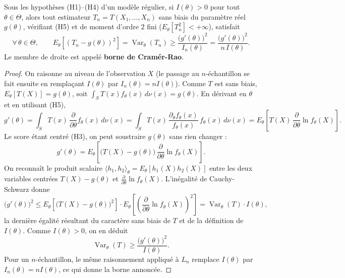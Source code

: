 \begin{mdframed}
\begin{proposition}
Sous les hypothèses (H1)--(H4) d'un modèle régulier, si $I(\theta) > 0$ pour tout
$\theta \in \Theta$, alors tout estimateur $T_n = T(X_1, \dots, X_n)$ sans biais du
paramètre réel $g(\theta)$, vérifiant (H5) et de moment d'ordre $2$ fini
($E_\theta[T_n^2] < +\infty$), satisfait
\[
  \forall\, \theta \in \Theta, \qquad
  E_\theta\!\left[ (T_n - g(\theta))^{2} \right]
  = \operatorname{Var}_\theta(T_n)
  \geq \frac{\bigl(g'(\theta)\bigr)^{2}}{I_n(\theta)}
  = \frac{\bigl(g'(\theta)\bigr)^{2}}{n\, I(\theta)}.
\]
Le membre de droite est appelé \textbf{borne de Cramér-Rao}.
\end{proposition}
\end{mdframed}

\begin{proof}
On raisonne au niveau de l'observation $X$ (le passage au $n$-échantillon se fait
ensuite en remplaçant $I(\theta)$ par $I_n(\theta) = n I(\theta)$). Comme $T$ est
sans biais, $E_\theta[T(X)] = g(\theta)$, soit
$\int_S T(x) f_\theta(x)\, d\nu(x) = g(\theta)$. En dérivant en $\theta$ et en
utilisant (H5),
\[
  g'(\theta)
  = \int_S T(x)\, \frac{\partial}{\partial\theta} f_\theta(x)\, d\nu(x)
  = \int_S T(x)\, \frac{\partial_\theta f_\theta(x)}{f_\theta(x)}\, f_\theta(x)\, d\nu(x)
  = E_\theta\!\left[ T(X)\, \frac{\partial}{\partial\theta} \ln f_\theta(X) \right].
\]
Le score étant centré (H3), on peut soustraire $g(\theta)$ sans rien changer :
\[
  g'(\theta)
  = E_\theta\!\left[ \bigl(T(X) - g(\theta)\bigr)\, \frac{\partial}{\partial\theta} \ln f_\theta(X) \right].
\]
On reconnaît le produit scalaire $\langle h_1, h_2 \rangle_\theta =
E_\theta[h_1(X) h_2(X)]$ entre les deux variables centrées $T(X) - g(\theta)$ et
$\frac{\partial}{\partial\theta} \ln f_\theta(X)$. L'inégalité de Cauchy-Schwarz
donne
\[
  \bigl(g'(\theta)\bigr)^{2}
  \leq E_\theta\!\left[ \bigl(T(X) - g(\theta)\bigr)^{2} \right]
       \cdot E_\theta\!\left[ \left( \frac{\partial}{\partial\theta} \ln f_\theta(X) \right)^{2} \right]
  = \operatorname{Var}_\theta(T)\cdot I(\theta),
\]
la dernière égalité résultant du caractère sans biais de $T$ et de la définition de
$I(\theta)$. Comme $I(\theta) > 0$, on en déduit
\[
  \operatorname{Var}_\theta(T) \geq \frac{\bigl(g'(\theta)\bigr)^{2}}{I(\theta)}.
\]
Pour un $n$-échantillon, le même raisonnement appliqué à $L_n$ remplace $I(\theta)$
par $I_n(\theta) = n I(\theta)$, ce qui donne la borne annoncée. \qedhere
\end{proof}

